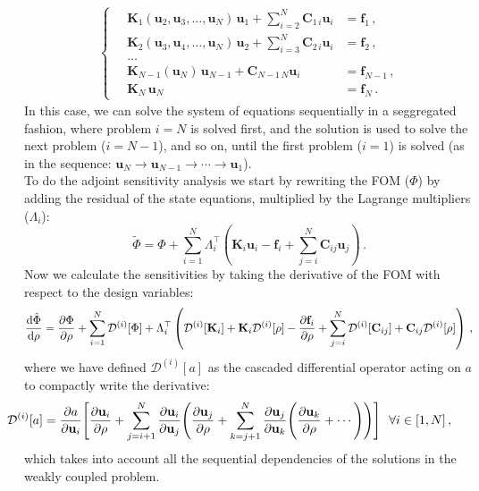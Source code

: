 \begin{align}
\left\{
    \begin{aligned}
        \quad \mathbf{K}_1(\mathbf{u}_2, \mathbf{u}_3, \ldots, \mathbf{u}_N)\, \mathbf{u}_1  + \sum_{i=2}^N \mathbf{C}_{1 \, i} \mathbf{u}_i &= \mathbf{f}_1\,, \\
        \quad\mathbf{K}_2(\mathbf{u}_3, \mathbf{u}_4, \ldots, \mathbf{u}_N)\, \mathbf{u}_2 + \sum_{i=3}^N \mathbf{C}_{2 \, i} \mathbf{u}_i &= \mathbf{f}_2\,, \\
        \quad\ldots \\
        \quad\mathbf{K}_{N-1} (\mathbf{u}_N) \, \mathbf{u}_{N-1} + \mathbf{C}_{N-1\, N} \mathbf{u}_i &= \mathbf{f}_{N-1} \,, \\
        \quad\mathbf{K}_N \, \mathbf{u}_N &= \mathbf{f}_N\,.
    \end{aligned}
\right.
\end{align}
In this case, we can solve the system of equations sequentially in a seggregated fashion,
 where problem $i=N$ is solved first, and the solution is used to solve the next problem ($i=N-1$), and so on, until the first problem ($i=1$) is solved
 (as in the sequence: $\mathbf{u}_N \to \mathbf{u}_{N-1} \to \cdots \to \mathbf{u}_1$).\\

To do the adjoint sensitivity analysis we start by rewriting the FOM ($\Phi$) by adding the residual
of the state equations, multiplied by the Lagrange multipliers ($\Lambda_i$):
\begin{equation}\label{eq:adj_init}
    \tilde{\Phi} =\Phi + \sum^N_{i=1} \Lambda_{i}^{\top}\left(\mathbf{K}_i \mathbf{u}_i -\mathbf{f}_i + \sum^N_{j=i} \mathbf{C}_{ij} \mathbf{u}_j \right)\,.
\end{equation}
Now we calculate the sensitivities by taking the derivative of the FOM with respect to the design variables:
\begin{equation}
    \frac{\mathop{}\!\text{d} \tilde{\Phi}}{\mathop{}\!\text{d} \rho} = \frac{\partial \Phi}{\partial \rho} + \sum^N_{i=1} \mathcal{D}^{(i)}[\Phi] 
    + \Lambda_i^\top \left( \mathcal{D}^{(i)}[\mathbf{K}_i] + \mathbf{K}_i \mathcal{D}^{(i)}[\rho] -\frac{\partial \mathbf{f}_i}{\partial \rho} + \sum_{j=i}^{N} \mathcal{D}^{(i)}[\mathbf{C}_{ij}] + \mathbf{C}_{ij} \mathcal{D}^{(i)}[\rho] \right)\,,
\end{equation}\label{eq:sens_init}
where we have defined $\mathcal{D}^{(i)}[a]$ as the cascaded differential operator acting on $a$ to compactly write the derivative:
\begin{align}
    \hspace*{-0.775cm}\mathcal{D}^{(i)}[a] &= \frac{\partial a}{\partial \mathbf{u}_i} \Bigg[ \frac{\partial \mathbf{u}_i}{\partial \rho} + 
    \sum_{j=i+1}^{N} \frac{\partial \mathbf{u}_i}{\partial \mathbf{u}_j} \Bigg( \frac{\partial \mathbf{u}_j}{\partial \rho} + 
    \sum_{k=j+1}^{N} \frac{\partial \mathbf{u}_j}{\partial \mathbf{u}_k} \Bigg( \frac{\partial \mathbf{u}_k}{\partial \rho} + \cdots \Bigg) \Bigg) \Bigg] \,\,\,\, \forall i \in [1, N] \,,
\end{align}
which takes into account all the sequential dependencies of the solutions in the weakly coupled problem.

